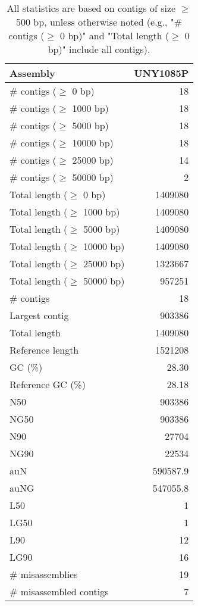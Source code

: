 \documentclass[12pt,a4paper]{article}
\begin{document}
\begin{table}[ht]
\begin{center}
\caption{All statistics are based on contigs of size $\geq$ 500 bp, unless otherwise noted (e.g., "\# contigs ($\geq$ 0 bp)" and "Total length ($\geq$ 0 bp)" include all contigs).}
\begin{tabular}{|l*{1}{|r}|}
\hline
Assembly & UNY1085P \\ \hline
\# contigs ($\geq$ 0 bp) & 18 \\ \hline
\# contigs ($\geq$ 1000 bp) & 18 \\ \hline
\# contigs ($\geq$ 5000 bp) & 18 \\ \hline
\# contigs ($\geq$ 10000 bp) & 18 \\ \hline
\# contigs ($\geq$ 25000 bp) & 14 \\ \hline
\# contigs ($\geq$ 50000 bp) & 2 \\ \hline
Total length ($\geq$ 0 bp) & 1409080 \\ \hline
Total length ($\geq$ 1000 bp) & 1409080 \\ \hline
Total length ($\geq$ 5000 bp) & 1409080 \\ \hline
Total length ($\geq$ 10000 bp) & 1409080 \\ \hline
Total length ($\geq$ 25000 bp) & 1323667 \\ \hline
Total length ($\geq$ 50000 bp) & 957251 \\ \hline
\# contigs & 18 \\ \hline
Largest contig & 903386 \\ \hline
Total length & 1409080 \\ \hline
Reference length & 1521208 \\ \hline
GC (\%) & 28.30 \\ \hline
Reference GC (\%) & 28.18 \\ \hline
N50 & 903386 \\ \hline
NG50 & 903386 \\ \hline
N90 & 27704 \\ \hline
NG90 & 22534 \\ \hline
auN & 590587.9 \\ \hline
auNG & 547055.8 \\ \hline
L50 & 1 \\ \hline
LG50 & 1 \\ \hline
L90 & 12 \\ \hline
LG90 & 16 \\ \hline
\# misassemblies & 19 \\ \hline
\# misassembled contigs & 7 \\ \hline

\end{tabular}
\end{center}
\end{table}
\end{document}
